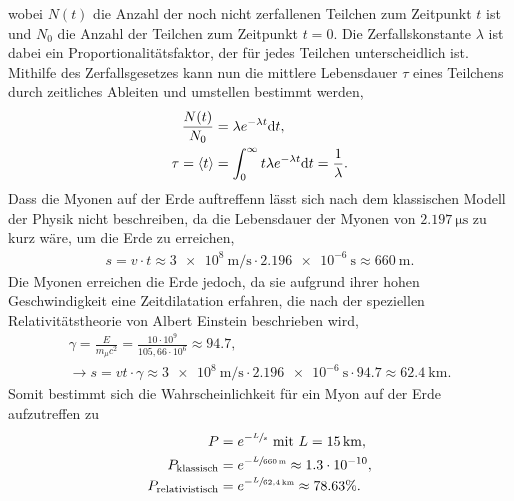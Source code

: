 wobei $N(t)$ die Anzahl der noch nicht zerfallenen Teilchen zum Zeitpunkt $t$ ist und $N_0$ die Anzahl der Teilchen zum Zeitpunkt $t=0$.
Die Zerfallskonstante $\lambda$ ist dabei ein Proportionalitätsfaktor, der für jedes Teilchen unterscheidlich ist.
Mithilfe des Zerfallsgesetzes kann nun die mittlere Lebensdauer $\tau$ eines Teilchens durch zeitliches Ableiten und umstellen bestimmt werden,
\begin{align}
    \frac{N(t)}{N_0}&=\lambda e^{-\lambda t}\text dt, \\
    \tau = \braket t &= \int_0^\infty t\lambda e^{-\lambda t}\text dt = \frac{1}{\lambda}.
\end{align}
Dass die Myonen auf der Erde auftreffenn lässt sich nach dem klassischen Modell der Physik nicht beschreiben, da die Lebensdauer der Myonen von $\SI{2.197}{\micro\second}$ zu kurz wäre, um die Erde zu erreichen,
\begin{align*}
    s = v\cdot t\approx \SI{3e8}{\meter\per\second}\cdot \SI{2.196e-6}{\second}\approx \SI{660}{\meter}.
\end{align*}
Die Myonen erreichen die Erde jedoch, da sie aufgrund ihrer hohen Geschwindigkeit eine Zeitdilatation erfahren, die nach der speziellen Relativitätstheorie von Albert Einstein beschrieben wird,
\begin{align*}
    \gamma = \frac{E}{m_\mu c^2} = \frac{10\cdot 10^9}{105,66\cdot 10^6}\approx94.7, \\
    \rightarrow s = vt\cdot\gamma\approx \SI{3e8}{\meter\per\second}\cdot \SI{2.196e-6}{\second} \cdot 94.7\approx \SI{62.4}{\kilo\meter}.
\end{align*}
Somit bestimmt sich die Wahrscheinlichkeit für ein Myon auf der Erde aufzutreffen zu
\begin{align*}
    P&=e^{-\sfrac{L}{s}}\ \text{mit}\ L=\SI{15}{\kilo\meter}, \\
    P_{\text{klassisch}} &= e^{-\sfrac{L}{\SI{660}{\meter}}}\approx 1.3\cdot 10^{-10}, \\
    P_{\text{relativistisch}} &= e^{-\sfrac{L}{\SI{62.4}{\kilo\meter}}}\approx 78.63\%.
\end{align*}